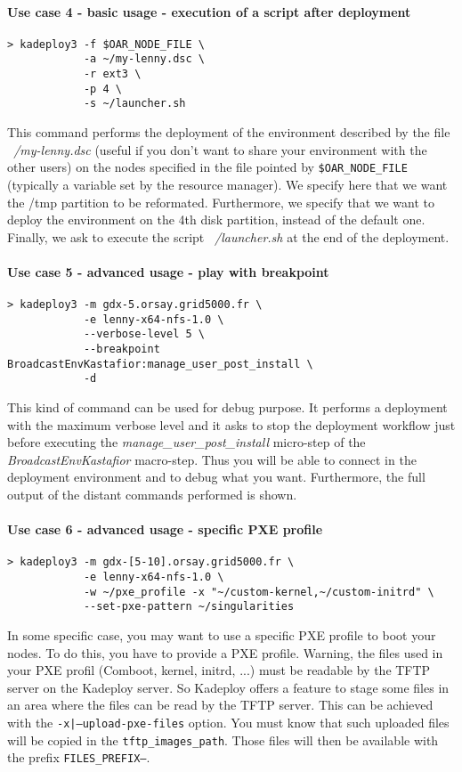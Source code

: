 \documentclass[a4wide,10pt,oneside]{book}
\begin{document}
\paragraph{Use case 4 - basic usage - execution of a script after deployment}
\begin{verbatim}
> kadeploy3 -f $OAR_NODE_FILE \
            -a ~/my-lenny.dsc \
            -r ext3 \
            -p 4 \
            -s ~/launcher.sh
\end{verbatim}
This command performs the deployment of the environment described by the file \textit{~/my-lenny.dsc} (useful if you don't want to share your environment with the other users) on the nodes specified in the file pointed by \texttt{\$OAR\_NODE\_FILE} (typically a variable set by the resource manager). We specify here that we want the /tmp partition to be reformated. Furthermore, we specify that we want to deploy the environment on the 4th disk partition, instead of the default one. Finally, we ask to execute the script \textit{~/launcher.sh} at the end of the deployment.

\paragraph{Use case 5 - advanced usage - play with breakpoint}
\begin{verbatim}
> kadeploy3 -m gdx-5.orsay.grid5000.fr \
            -e lenny-x64-nfs-1.0 \
            --verbose-level 5 \
            --breakpoint BroadcastEnvKastafior:manage_user_post_install \
            -d
\end{verbatim}
This kind of command can be used for debug purpose. It performs a deployment with the maximum verbose level and it asks to stop the deployment workflow just before executing the \textit{manage\_user\_post\_install} micro-step of the \textit{BroadcastEnvKastafior} macro-step. Thus you will be able to connect in the deployment environment and to debug what you want. Furthermore, the full output of the distant commands performed is shown.

\paragraph{Use case 6 - advanced usage - specific PXE profile}
\begin{verbatim}
> kadeploy3 -m gdx-[5-10].orsay.grid5000.fr \
            -e lenny-x64-nfs-1.0 \
            -w ~/pxe_profile -x "~/custom-kernel,~/custom-initrd" \
            --set-pxe-pattern ~/singularities
\end{verbatim}
In some specific case, you may want to use a specific PXE profile to boot your nodes. To do this, you have to provide a PXE profile. Warning, the files used in your PXE profil (Comboot, kernel, initrd, ...) must be readable by the TFTP server on the Kadeploy server. So Kadeploy offers a feature to stage some files in an area where the files can be read by the TFTP server. This can be achieved with the \texttt{-x|--upload-pxe-files} option. You must know that such uploaded files will be copied in the \texttt{tftp\_images\_path}. Those files will then be available with the prefix \texttt{FILES\_PREFIX--}.
\end{document}
